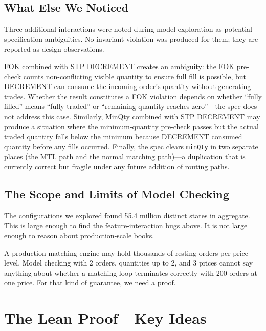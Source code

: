 \documentclass[11pt,a4paper]{article}
\begin{document}
\subsection{What Else We Noticed}
\label{sec:observations}

Three additional interactions were noted during model exploration as
potential specification ambiguities. No invariant violation was produced
for them; they are reported as design observations.

FOK combined with STP DECREMENT creates an ambiguity: the FOK pre-check
counts non-conflicting visible quantity to ensure full fill is possible,
but DECREMENT can consume the incoming order's quantity without
generating trades. Whether the result constitutes a FOK violation
depends on whether ``fully filled'' means ``fully traded'' or
``remaining quantity reaches zero''---the spec does not address this
case. Similarly, MinQty combined with STP DECREMENT may produce a
situation where the minimum-quantity pre-check passes but the actual
traded quantity falls below the minimum because DECREMENT consumed
quantity before any fills occurred. Finally, the spec clears
\texttt{minQty} in two separate places (the MTL path and the normal
matching path)---a duplication that is currently correct but fragile
under any future addition of routing paths.

\subsection{The Scope and Limits of Model Checking}
\label{sec:tlc-limits}

The configurations we explored found 55.4 million distinct states in
aggregate. This is large enough to find the feature-interaction bugs above. It is
not large enough to reason about production-scale books.

A production matching engine may hold thousands of resting orders per
price level. Model checking with 2 orders, quantities up to 2, and 3
prices cannot say anything about whether a matching loop terminates
correctly with 200 orders at one price. For that kind of guarantee, we
need a proof.


\section{The Lean Proof---Key Ideas}
\label{sec:lean}
\end{document}
